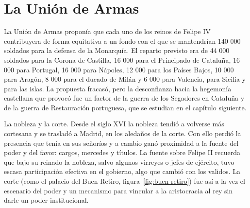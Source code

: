 \documentclass{book}
\begin{document}
\section{La Unión de Armas}

La Unión de Armas proponía que cada uno de los reinos de Felipe IV contribuyera de forma equitativa a un fondo con el que se mantendrían 140 000 soldados para la defensa de la Monarquía. El reparto previsto era de 44 000 soldados para la Corona de Castilla, 16 000 para el Principado de Cataluña, 16 000 para Portugal, 16 000 para Nápoles, 12 000 para los Países Bajos, 10 000 para Aragón, 8 000 para el ducado de Milán y 6 000 para Valencia, para Sicilia y para las islas. La propuesta fracasó, pero la desconfianza hacia la hegemonía castellana que provocó fue un factor de la guerra de los Segadores en Cataluña y de la guerra de Restauración portuguesa, que se estudian en el capítulo siguiente.


La nobleza y la corte. Desde el siglo XVI la nobleza tendió a volverse más cortesana y se trasladó a Madrid, en los aledaños de la corte. Con ello perdió la presencia que tenía en sus señoríos y a cambio ganó proximidad a la fuente del poder y del favor: cargos, mercedes y títulos. La fuente sobre Felipe II recuerda que bajo su reinado la nobleza, salvo algunos virreyes o jefes de ejército, tuvo escasa participación efectiva en el gobierno, algo que cambió con los validos. La corte (como el palacio del Buen Retiro, figura~\ref{fig:buen-retiro}) fue así a la vez el escenario del poder y un mecanismo para vincular a la aristocracia al rey sin darle un poder institucional.

\end{document}
